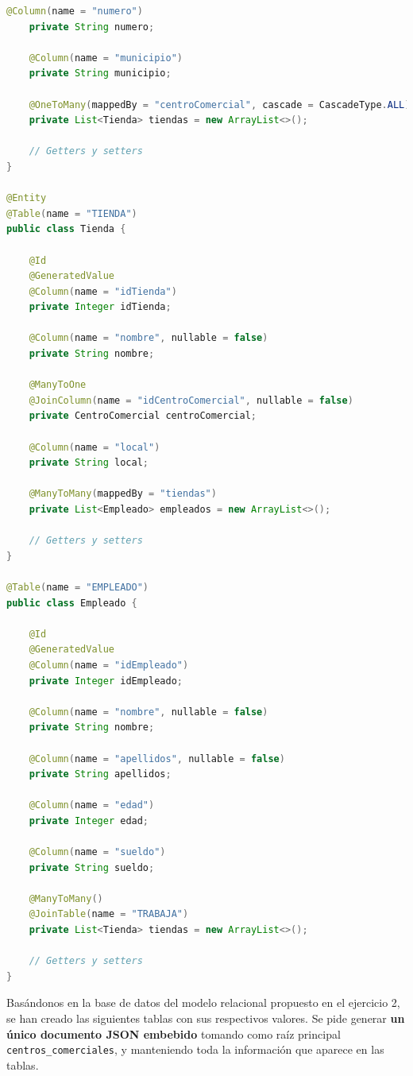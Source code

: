 \documentclass[12pt,a4paper,addpoints,answers]{exam}
\begin{document}
\begin{questions}
\begin{solution}
\begin{lstlisting}[language=Java]
    @Column(name = "numero")
    private String numero;

    @Column(name = "municipio")
    private String municipio;

    @OneToMany(mappedBy = "centroComercial", cascade = CascadeType.ALL)
    private List<Tienda> tiendas = new ArrayList<>();

    // Getters y setters
}

@Entity
@Table(name = "TIENDA")
public class Tienda {

    @Id
    @GeneratedValue
    @Column(name = "idTienda")
    private Integer idTienda;

    @Column(name = "nombre", nullable = false)
    private String nombre;

    @ManyToOne
    @JoinColumn(name = "idCentroComercial", nullable = false)
    private CentroComercial centroComercial;

    @Column(name = "local")
    private String local;

    @ManyToMany(mappedBy = "tiendas")
    private List<Empleado> empleados = new ArrayList<>();

    // Getters y setters
}

@Table(name = "EMPLEADO")
public class Empleado {

    @Id
    @GeneratedValue
    @Column(name = "idEmpleado")
    private Integer idEmpleado;

    @Column(name = "nombre", nullable = false)
    private String nombre;

    @Column(name = "apellidos", nullable = false)
    private String apellidos;

    @Column(name = "edad")
    private Integer edad;

    @Column(name = "sueldo")
    private String sueldo;

    @ManyToMany()
    @JoinTable(name = "TRABAJA")
    private List<Tienda> tiendas = new ArrayList<>();

    // Getters y setters
}
\end{lstlisting}       
\end{solution}

\newpage
\question[\half] Basándonos en la base de datos del modelo relacional propuesto en el ejercicio 2, se han creado las siguientes tablas con sus respectivos valores. Se pide generar \textbf{un único documento JSON embebido} tomando como raíz principal \texttt{centros\_comerciales}, y manteniendo toda la información que aparece en las tablas.


\end{questions}
\end{document}
